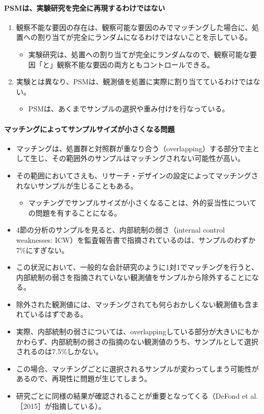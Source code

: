 \paragraph{PSMは、実験研究を完全に再現するわけではない}

\begin{enumerate}
 \item 観察不能な要因の存在は、観察可能な要因のみでマッチングした場合に、処置への割り当てが完全にランダムになるわけではないことを示している。
  \begin{itemize}
   \item 実験研究は、処置への割り当てが完全にランダムなので、観察可能な要因「と」観察不能な要因の両方ともコントロールできる。
  \end{itemize}
 \item 実験とは異なり、PSMは、観測値を処置に実際に割り当てているわけではない。
  \begin{itemize}
   \item PSMは、あくまでサンプルの選択や重み付けを行なっている。
  \end{itemize}
\end{enumerate}

\paragraph{マッチングによってサンプルサイズが小さくなる問題}
\begin{itemize}
 \item マッチングは、処置群と対照群が重なり合う（overlapping）する部分で主として生じ、その範囲外のサンプルはマッチングされない可能性が高い。
 \item その範囲においてさえも、リサーチ・デザインの設定によってマッチングされないサンプルが生じることもある。
 \begin{itemize}
  \item マッチングでサンプルサイズが小さくなることは、外的妥当性についての問題を有することになる。
 \end{itemize}
 \item 4節の分析のサンプルを見ると、内部統制の弱さ（internal control weaknesses: ICW）を監査報告書で指摘されているのは、サンプルのわずか7\%にすぎない。
 \item この状況において、一般的な会計研究のように1対1でマッチングを行うと、内部統制の弱さを指摘されていない観測値をサンプルから除外することになる。
 \item 除外された観測値には、マッチングされても何らおかしくない観測値も含まれているはずである。
 \item 実際、内部統制の弱さについては、overlappingしている部分が大きいにもかかわらず、内部統制の弱さの指摘のない観測値のうち、サンプルとして選択されるのは7.5\%しかない。
 \item この場合、マッチングごとに選択されるサンプルが変わってしまう可能性があるので、再現性に問題が生じてしまう。
 \item 研究ごとに同様の結果が確認されることが重要となってくる（DeFond et al.［2015］が指摘している）。
\end{itemize}

